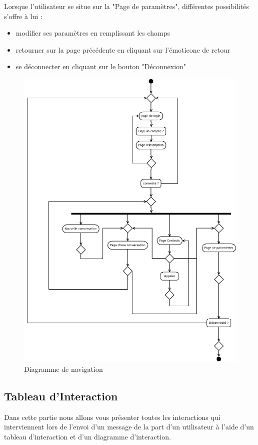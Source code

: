 \documentclass[a4paper,12pt]{article}
\begin{document}
	Lorsque l'utilisateur se situe sur la "Page de paramètres", différentes possibilités s'offre à lui :
	\begin{itemize}
		\item modifier ses paramètres en remplissant les champs
		\item retourner sur la page précédente en cliquant sur l'émoticone de retour
		\item se déconnecter en cliquant sur le bouton "Déconnexion"\\
	\end{itemize}

	\begin{figure}[H]
		\centerline{\includegraphics[width=16.5cm]{../diagrammes/img/navigation.png}}
		\caption{Diagramme de navigation}
	\end{figure}


	\subsection{Tableau d’Interaction}
	Dans cette partie nous allons vous présenter toutes les interactions qui interviennent lors de l'envoi d'un message de la part d'un utilisateur à l'aide d'un tableau d’interaction et d'un diagramme d’interaction.
\end{document}
